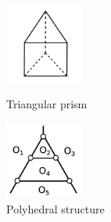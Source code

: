 \documentclass[suppldata, dvipdfmx]{interact}
\theoremstyle{plain}%
\theoremstyle{definition}
\theoremstyle{remark}
\theoremstyle{problemstyle}
\begin{document}
\begin{figure}[h!tbp]
  \begin{minipage}[t]{0.5\textwidth}
   \centering
   \includegraphics[width=1in, keepaspectratio]{./img/HexahedraWithSphericalFaces/pentahedralPrism/pentahedralPrism.jpg}
   \caption{Triangular prism}
   \label{fig:triangularPrism}
  \end{minipage}
 \hspace*{\fill}
  \begin{minipage}[t]{0.5\textwidth}
   \centering
   \includegraphics[width=1in, keepaspectratio]{./img/HexahedraWithSphericalFaces/pentahedralPrism/faces.jpg}
   \caption{Polyhedral structure}
   \label{fig:triangularPrismPolyhedralStructure}
  \end{minipage}
\end{figure}
\end{document}
